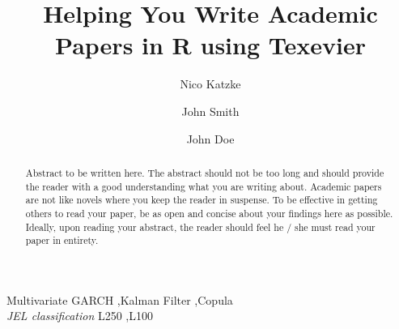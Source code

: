 \documentclass[11pt,preprint, authoryear]{elsarticle}
\numberwithin{equation}{section}
\numberwithin{figure}{section}
\numberwithin{table}{section}
\begin{document}
\begin{frontmatter}  %

\title{Helping You Write Academic Papers in R using Texevier}





\author[Add1]{Nico Katzke}

\author[Add1,Add2]{John Smith}

\author[Add1,Add2]{John Doe}



\address[Add1]{Prescient Securities, Cape Town, South Africa}
\address[Add2]{Some other Institution, Cape Town, South Africa}


\begin{abstract}
\small{
Abstract to be written here. The abstract should not be too long and
should provide the reader with a good understanding what you are writing
about. Academic papers are not like novels where you keep the reader in
suspense. To be effective in getting others to read your paper, be as
open and concise about your findings here as possible. Ideally, upon
reading your abstract, the reader should feel he / she must read your
paper in entirety.
}
\end{abstract}

\vspace{1cm}

\begin{keyword}
\footnotesize{
Multivariate GARCH \sep Kalman Filter \sep Copula \\ \vspace{0.3cm}
\textit{JEL classification} L250 \sep L100
}
\end{keyword}
\vspace{0.5cm}
\end{frontmatter}



\pagestyle{fancy}
\chead{}
\rhead{}
\lfoot{}
\lhead{}
\cfoot{}


\headsep 35pt %
\end{document}
